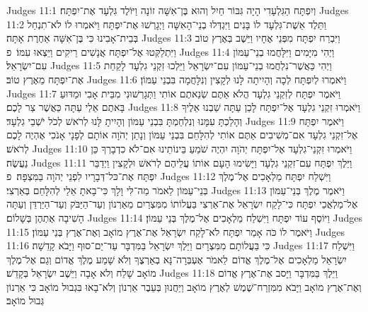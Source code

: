 Judges 11:1	וְיִפְתָּח הַגִּלְעָדִי הָיָה גִּבּוֹר חַיִל וְהוּא בֶּן־אִשָּׁה זוֹנָה וַיּוֹלֶד גִּלְעָד אֶת־יִפְתָּח׃
Judges 11:2	וַתֵּלֶד אֵשֶׁת־גִּלְעָד לוֹ בָּנִים וַיִּגְדְּלוּ בְנֵי־הָאִשָּׁה וַיְגָרְשׁוּ אֶת־יִפְתָּח וַיֹּאמְרוּ לוֹ לֹא־תִנְחַל בְּבֵית־אָבִינוּ כִּי בֶּן־אִשָּׁה אַחֶרֶת אָתָּה׃
Judges 11:3	וַיִּבְרַח יִפְתָּח מִפְּנֵי אֶחָיו וַיֵּשֶׁב בְּאֶרֶץ טוֹב וַיִּתְלַקְּטוּ אֶל־יִפְתָּח אֲנָשִׁים רֵיקִים וַיֵּצְאוּ עִמּוֹ׃ {פ}
Judges 11:4	וַיְהִי מִיָּמִים וַיִּלָּחֲמוּ בְנֵי־עַמּוֹן עִם־יִשְׂרָאֵל׃
Judges 11:5	וַיְהִי כַּאֲשֶׁר־נִלְחֲמוּ בְנֵי־עַמּוֹן עִם־יִשְׂרָאֵל וַיֵּלְכוּ זִקְנֵי גִלְעָד לָקַחַת אֶת־יִפְתָּח מֵאֶרֶץ טוֹב׃
Judges 11:6	וַיֹּאמְרוּ לְיִפְתָּח לְכָה וְהָיִיתָה לָּנוּ לְקָצִין וְנִלָּחֲמָה בִּבְנֵי עַמּוֹן׃
Judges 11:7	וַיֹּאמֶר יִפְתָּח לְזִקְנֵי גִלְעָד הֲלֹא אַתֶּם שְׂנֵאתֶם אוֹתִי וַתְּגָרְשׁוּנִי מִבֵּית אָבִי וּמַדּוּעַ בָּאתֶם אֵלַי עַתָּה כַּאֲשֶׁר צַר לָכֶם׃
Judges 11:8	וַיֹּאמְרוּ זִקְנֵי גִלְעָד אֶל־יִפְתָּח לָכֵן עַתָּה שַׁבְנוּ אֵלֶיךָ וְהָלַכְתָּ עִמָּנוּ וְנִלְחַמְתָּ בִּבְנֵי עַמּוֹן וְהָיִיתָ לָּנוּ לְרֹאשׁ לְכֹל יֹשְׁבֵי גִלְעָד׃
Judges 11:9	וַיֹּאמֶר יִפְתָּח אֶל־זִקְנֵי גִלְעָד אִם־מְשִׁיבִים אַתֶּם אוֹתִי לְהִלָּחֵם בִּבְנֵי עַמּוֹן וְנָתַן יְהֹוָה אוֹתָם לְפָנָי אָנֹכִי אֶהְיֶה לָכֶם לְרֹאשׁ׃
Judges 11:10	וַיֹּאמְרוּ זִקְנֵי־גִלְעָד אֶל־יִפְתָּח יְהֹוָה יִהְיֶה שֹׁמֵעַ בֵּינוֹתֵינוּ אִם־לֹא כִדְבָרְךָ כֵּן נַעֲשֶׂה׃
Judges 11:11	וַיֵּלֶךְ יִפְתָּח עִם־זִקְנֵי גִלְעָד וַיָּשִׂימוּ הָעָם אוֹתוֹ עֲלֵיהֶם לְרֹאשׁ וּלְקָצִין וַיְדַבֵּר יִפְתָּח אֶת־כּל־דְּבָרָיו לִפְנֵי יְהֹוָה בַּמִּצְפָּה׃ {פ}
Judges 11:12	וַיִּשְׁלַח יִפְתָּח מַלְאָכִים אֶל־מֶלֶךְ בְּנֵי־עַמּוֹן לֵאמֹר מַה־לִּי וָלָךְ כִּי־בָאתָ אֵלַי לְהִלָּחֵם בְּאַרְצִי׃
Judges 11:13	וַיֹּאמֶר מֶלֶךְ בְּנֵי־עַמּוֹן אֶל־מַלְאֲכֵי יִפְתָּח כִּי־לָקַח יִשְׂרָאֵל אֶת־אַרְצִי בַּעֲלוֹתוֹ מִמִּצְרַיִם מֵאַרְנוֹן וְעַד־הַיַּבֹּק וְעַד־הַיַּרְדֵּן וְעַתָּה הָשִׁיבָה אֶתְהֶן בְּשָׁלוֹם׃
Judges 11:14	וַיּוֹסֶף עוֹד יִפְתָּח וַיִּשְׁלַח מַלְאָכִים אֶל־מֶלֶךְ בְּנֵי עַמּוֹן׃
Judges 11:15	וַיֹּאמֶר לוֹ כֹּה אָמַר יִפְתָּח לֹא־לָקַח יִשְׂרָאֵל אֶת־אֶרֶץ מוֹאָב וְאֶת־אֶרֶץ בְּנֵי עַמּוֹן׃
Judges 11:16	כִּי בַּעֲלוֹתָם מִמִּצְרָיִם וַיֵּלֶךְ יִשְׂרָאֵל בַּמִּדְבָּר עַד־יַם־סוּף וַיָּבֹא קָדֵשָׁה׃
Judges 11:17	וַיִּשְׁלַח יִשְׂרָאֵל מַלְאָכִים  אֶל־מֶלֶךְ אֱדוֹם  לֵאמֹר אֶעְבְּרָה־נָּא בְאַרְצֶךָ וְלֹא שָׁמַע מֶלֶךְ אֱדוֹם וְגַם אֶל־מֶלֶךְ מוֹאָב שָׁלַח וְלֹא אָבָה וַיֵּשֶׁב יִשְׂרָאֵל בְּקָדֵשׁ׃
Judges 11:18	וַיֵּלֶךְ בַּמִּדְבָּר וַיָּסב אֶת־אֶרֶץ אֱדוֹם וְאֶת־אֶרֶץ מוֹאָב וַיָּבֹא מִמִּזְרַח־שֶׁמֶשׁ לְאֶרֶץ מוֹאָב וַיַּחֲנוּן בְּעֵבֶר אַרְנוֹן וְלֹא־בָאוּ בִּגְבוּל מוֹאָב כִּי אַרְנוֹן גְּבוּל מוֹאָב׃

